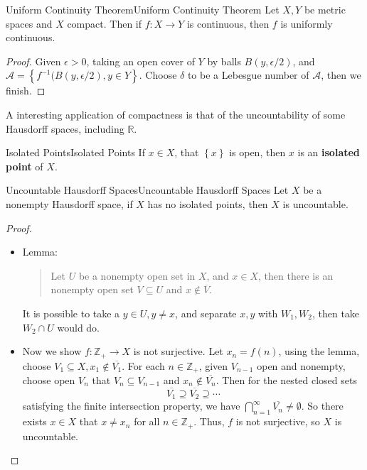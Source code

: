 \documentclass[../main.tex]{subfiles}
\begin{document}
\begin{theorem}{Uniform Continuity Theorem}{Uniform Continuity Theorem}
Let $X,Y$ be metric spaces and $X$ compact. Then if $f:X \rightarrow Y$ is continuous, then $f$ is uniformly continuous.
\end{theorem}
\begin{proof}
Given $\epsilon>0$, taking an open cover of $Y$ by balls $B(y,\epsilon /2)$, and $\mathcal{A} = \left\{ f^{-1}(B(y, \epsilon /2), y\in Y \right\}$. Choose $\delta$ to be a Lebesgue number of $\mathcal{A}$, then we finish.
\end{proof}

A interesting application of compactness is that of the uncountability of some Hausdorff spaces, including $\mathbb{R}$.

\begin{definition}{Isolated Points}{Isolated Points}
	If $x\in X$, that $\left\{ x \right\}$ is open, then $x$ is an \textbf{isolated point} of $X$.
\end{definition}

\begin{theorem}{Uncountable Hausdorff Spaces}{Uncountable Hausdorff Spaces}
Let $X$ be a nonempty Hausdorff space, if $X$ has no isolated points, then $X$ is uncountable. 
\end{theorem}
\begin{proof}
\begin{itemize}
\item Lemma:
	\begin{quote}
	Let $U$ be a nonempty open set in $X$, and $x\in X$, then there is an nonempty open set $V \subseteq U$ and $x\notin \overline{V}$.
	\end{quote}
	It is possible to take a $y\in U,y\neq x$, and separate $x,y$ with $W_1,W_2$, then take $W_2\cap U$ would do.
\item Now we show $f: \mathbb{Z}_+ \rightarrow X$ is not surjective. Let $x_n = f(n)$, using the lemma, choose $V_1 \subseteq X, x_1\notin \overline{V_1}$. For each $n\in \mathbb{Z}_+$, given $V_{n-1}$ open and nonempty, choose open $V_n$ that $V_n \subseteq V_{n-1}$ and $x_n \notin \overline{V_n}$. Then for the nested closed sets
	\begin{equation*}
		\overline{V_1} \supseteq \overline{V_2} \supseteq \cdots
	\end{equation*}
	satisfying the finite intersection property, we have $\bigcap_{n=1}^{\infty} \overline{V_n} \neq \emptyset$. So there exists $x\in X$ that $x\neq x_n$ for all $n\in \mathbb{Z}_+$. Thus, $f$ is not surjective, so $X$ is uncountable.
\end{itemize}
\end{proof}
\end{document}
